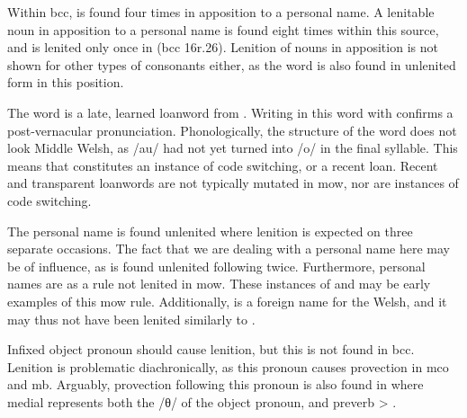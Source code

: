 Within \gls{bcc},  is found four times in apposition to a personal name.
A lenitable noun in apposition to a personal name is found eight times within this source, and is lenited only once in  (\gls{bcc} 16r.26).
Lenition of nouns in apposition is not shown for other types of consonants either, as the word  is also found in unlenited form in this position.

The word  is a late, learned loanword from .
Writing  in this word with  confirms a post-vernacular pronunciation.
Phonologically, the structure of the word does not look Middle Welsh, as /au/ had not yet turned into /o/ in the final syllable.
This means that  constitutes an instance of code switching, or a recent loan.
Recent and transparent loanwords are not typically mutated in \gls{mow}, nor are instances of code switching.

The personal name  is found unlenited where lenition is expected on three separate occasions.
The fact that we are dealing with a personal name here may be of influence, as  is found unlenited following  twice.
Furthermore, personal names are as a rule not lenited in \gls{mow}.
These instances of  and  may be early examples of this \gls{mow} rule.
Additionally,  is a foreign name for the Welsh, and it may thus not have been lenited similarly to .

Infixed object pronoun  should cause lenition, but this is not found in \gls{bcc}.
Lenition is problematic diachronically, as this pronoun causes provection in \gls{mco} and \gls{mb}.
Arguably, provection following this pronoun is also found in  where medial  represents both the /θ/ of the object pronoun, and preverb  > .

